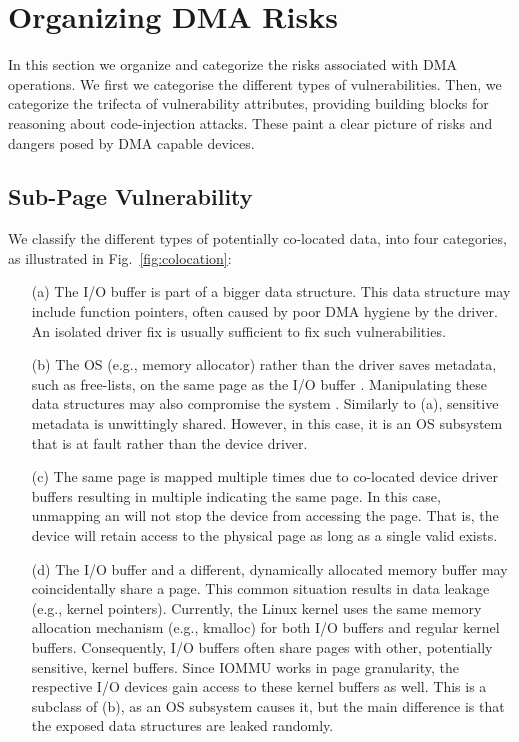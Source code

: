 
\section{Organizing DMA Risks}\label{sec:dma-risks}
In this section we organize and categorize the risks associated with DMA operations.
We first we categorise the different types of \subpage{} vulnerabilities.
Then, we categorize the trifecta of vulnerability attributes, providing building blocks for reasoning about code-injection attacks.
These paint a clear picture of risks and dangers posed by DMA capable devices.

\subsection{Sub-Page Vulnerability}\label{sec:subpage}

We classify the different types of potentially co-located data, into four categories, as illustrated in Fig.~\ref{fig:colocation}:

\begin{enumerate}
    \item[(a)] The I/O buffer is part of a bigger data structure. This data structure may include function pointers, often caused by poor DMA hygiene by the driver. An isolated driver fix is usually sufficient to fix such vulnerabilities.
    \item[(b)] The OS (e.g., memory allocator) rather than the driver saves metadata, such as free-lists, on the same page as the I/O buffer \cite{Cor07}. Manipulating these data structures may also compromise the system \cite{ak09}. Similarly to (a), sensitive metadata is unwittingly shared. However, in this case, it is an OS subsystem that is at fault rather than the device driver.
    \item[(c)] The same page is mapped multiple times due to co-located device driver buffers resulting in multiple \iova{} indicating the same page. 
    In this case, unmapping an \iova will not stop the device from accessing the page.
    That is, the device will retain access to the physical page as long as a single valid \iova{} exists.
    \item[(d)] The I/O buffer and a different, dynamically allocated memory buffer may coincidentally share a page. This common situation results in data leakage (e.g., kernel pointers). Currently, the Linux kernel uses the same memory allocation mechanism (e.g., kmalloc) for both I/O buffers and regular kernel buffers. Consequently, I/O buffers often share pages with other, potentially sensitive, kernel buffers. Since IOMMU works in page granularity, the respective I/O devices gain access to these kernel buffers as well. This is a subclass of (b), as an OS subsystem causes it, but the main difference is that the exposed data structures are leaked randomly.

\end{enumerate}

